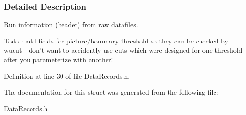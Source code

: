 \subsubsection{Detailed Description}
Run information (header) from raw datafiles. 

\begin{Desc}
\item[\hyperlink{todo__todo000010}{Todo}]: add fields for picture/boundary threshold so they can be checked by wucut -\/ don't want to accidently use cuts which were designed for one threshold after you parameterize with another! \end{Desc}


Definition at line 30 of file DataRecords.h.



The documentation for this struct was generated from the following file:\begin{DoxyCompactItemize}
\item 
DataRecords.h\end{DoxyCompactItemize}
